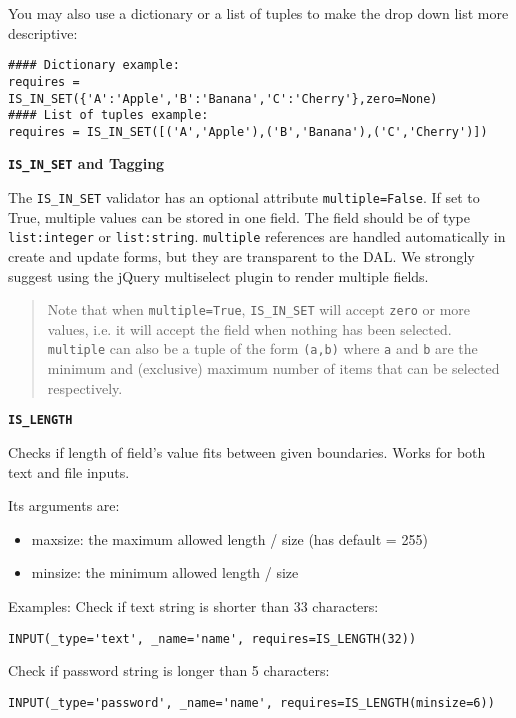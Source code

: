 \documentclass[justified,sixbynine,notoc]{tufte-book}
\def\ft{\small\tt}
\def\inxx#1{\index{#1}}
\begin{document}
\begin{fullwidth}
You may also use a dictionary or a list of tuples to make the drop down list more descriptive:
\begin{lstlisting}
#### Dictionary example:
requires = IS_IN_SET({'A':'Apple','B':'Banana','C':'Cherry'},zero=None)
#### List of tuples example:
requires = IS_IN_SET([('A','Apple'),('B','Banana'),('C','Cherry')])
\end{lstlisting}

{\bf {\ft IS\_IN\_SET} and Tagging}

The {\ft IS\_IN\_SET} validator has an optional attribute {\ft multiple=False}. If set to True, multiple values can be stored in one field. The field should be of type {\ft list:integer} or {\ft list:string}. {\ft multiple} references are handled automatically in create and update forms, but they are transparent to the DAL. We strongly suggest using the jQuery multiselect plugin to render multiple fields.

\begin{quote}Note that when {\ft multiple=True}, {\ft IS\_IN\_SET} will accept {\ft zero} or more values, i.e. it will accept the field when nothing has been selected. {\ft multiple} can also be a tuple of the form {\ft (a,b)} where {\ft a} and {\ft b} are the minimum and (exclusive) maximum number of items that can be selected respectively.\end{quote}
{\bf {\ft IS\_LENGTH}}

\inxx{IS\_LENGTH}

Checks if length of field's value fits between given boundaries. Works
for both text and file inputs.

Its arguments are:
\begin{itemize}
\item maxsize: the maximum allowed length / size (has default = 255)

\item minsize: the minimum allowed length / size
\end{itemize}

Examples:
Check if text string is shorter than 33 characters:
\begin{lstlisting}
INPUT(_type='text', _name='name', requires=IS_LENGTH(32))
\end{lstlisting}

Check if password string is longer than 5 characters:
\begin{lstlisting}
INPUT(_type='password', _name='name', requires=IS_LENGTH(minsize=6))
\end{lstlisting}


\end{fullwidth}
\end{document}
